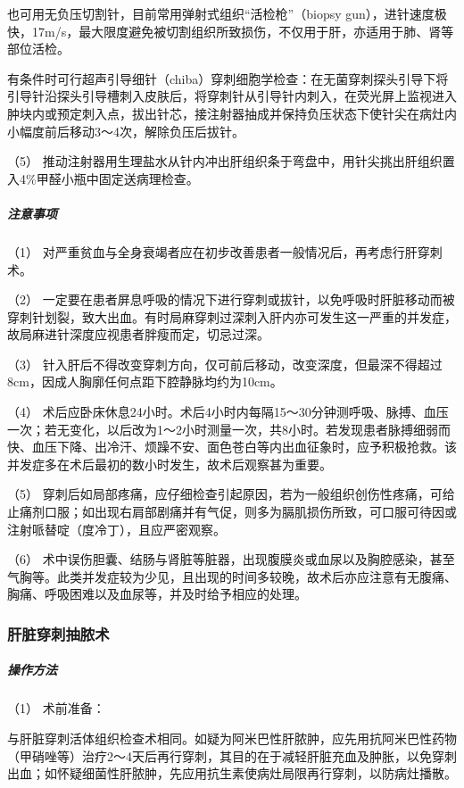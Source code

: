 也可用无负压切割针，目前常用弹射式组织“活检枪”（biopsy
gun），进针速度极快，17m/s，最大限度避免被切割组织所致损伤，不仅用于肝，亦适用于肺、肾等部位活检。

有条件时可行超声引导细针（chiba）穿刺细胞学检查：在无菌穿刺探头引导下将引导针沿探头引导槽刺入皮肤后，将穿刺针从引导针内刺入，在荧光屏上监视进入肿块内或预定刺入点，拔出针芯，接注射器抽成并保持负压状态下使针尖在病灶内小幅度前后移动3～4次，解除负压后拔针。

（5）
推动注射器用生理盐水从针内冲出肝组织条于弯盘中，用针尖挑出肝组织置入4\%甲醛小瓶中固定送病理检查。

\subparagraph{注意事项}

（1）
对严重贫血与全身衰竭者应在初步改善患者一般情况后，再考虑行肝穿刺术。

（2）
一定要在患者屏息呼吸的情况下进行穿刺或拔针，以免呼吸时肝脏移动而被穿刺针划裂，致大出血。有时局麻穿刺过深刺入肝内亦可发生这一严重的并发症，故局麻进针深度应视患者胖瘦而定，切忌过深。

（3）
针入肝后不得改变穿刺方向，仅可前后移动，改变深度，但最深不得超过8cm，因成人胸廓任何点距下腔静脉均约为10cm。

（4）
术后应卧床休息24小时。术后4小时内每隔15～30分钟测呼吸、脉搏、血压一次；若无变化，以后改为1～2小时测量一次，共8小时。若发现患者脉搏细弱而快、血压下降、出冷汗、烦躁不安、面色苍白等内出血征象时，应予积极抢救。该并发症多在术后最初的数小时发生，故术后观察甚为重要。

（5）
穿刺后如局部疼痛，应仔细检查引起原因，若为一般组织创伤性疼痛，可给止痛剂口服；如出现右肩部剧痛并有气促，则多为膈肌损伤所致，可口服可待因或注射哌替啶（度冷丁），且应严密观察。

（6）
术中误伤胆囊、结肠与肾脏等脏器，出现腹膜炎或血尿以及胸腔感染，甚至气胸等。此类并发症较为少见，且出现的时间多较晚，故术后亦应注意有无腹痛、胸痛、呼吸困难以及血尿等，并及时给予相应的处理。

\subsubsection{肝脏穿刺抽脓术}

\subparagraph{操作方法}

\hypertarget{text00381.htmlux5cux23CHP16-7-5-2-1-1}{}
（1） 术前准备：

与肝脏穿刺活体组织检查术相同。如疑为阿米巴性肝脓肿，应先用抗阿米巴性药物（甲硝唑等）治疗2～4天后再行穿刺，其目的在于减轻肝脏充血及肿胀，以免穿刺出血；如怀疑细菌性肝脓肿，先应用抗生素使病灶局限再行穿刺，以防病灶播散。

